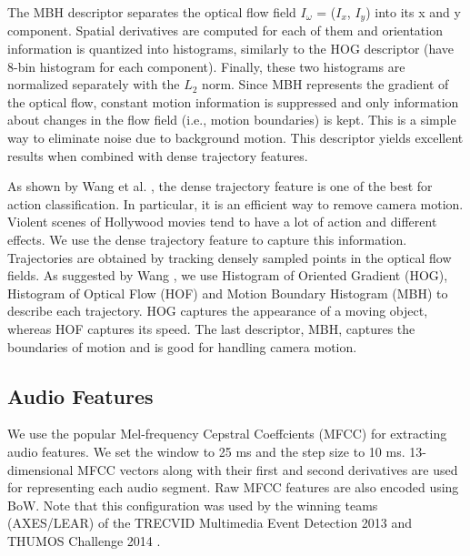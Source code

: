 The MBH descriptor separates the optical flow field $I_{\omega}$ = ($I_{x}$, $I_{y}$) into its x and y component. Spatial derivatives are computed for each of them and orientation information is quantized into histograms, similarly to the HOG descriptor (have 8-bin histogram for each component). Finally, these two histograms are normalized separately with the $L_{2}$ norm. Since MBH represents the gradient of the optical flow, constant motion information is suppressed and only information about changes in the flow field (i.e., motion boundaries) is kept. This is a simple way to eliminate noise due to background motion. This descriptor yields excellent results when combined with dense trajectory features.

As shown by Wang et al. \cite{wang:2011:inria-00583818:1,wang2013action}, the dense trajectory feature is one of the best for action classification. In particular, it is an efficient way to remove camera motion. Violent scenes of Hollywood movies tend to have a lot of action and different effects. We use the dense trajectory feature to capture this information. Trajectories are obtained by tracking densely sampled points in the optical flow fields. As suggested by Wang \cite{wang:2011:inria-00583818:1,wang2013action}, we use Histogram of Oriented Gradient (HOG), Histogram of Optical Flow (HOF) and Motion Boundary Histogram (MBH) to describe each trajectory. HOG captures the appearance of a moving object, whereas HOF captures its speed. The last descriptor, MBH, captures the boundaries of motion and is good for handling camera motion.


\subsection{Audio Features}
We use the popular Mel-frequency Cepstral Coeffcients (MFCC) \cite{rabiner2007introduction} for extracting audio features. We set the window to 25 ms and the step size to 10 ms. 13-dimensional MFCC vectors along with their first and second derivatives are used for representing each audio segment. Raw MFCC features are also encoded using BoW. Note that this configuration was used by the winning teams (AXES/LEAR) of the TRECVID Multimedia Event Detection 2013 \cite{aly2013axes} and THUMOS Challenge 2014 \cite{oneata2014lear}.

